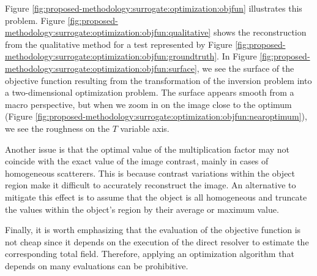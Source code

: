 			Figure \ref{fig:proposed-methodology:surrogate:optimization:objfun} illustrates this problem. Figure \ref{fig:proposed-methodology:surrogate:optimization:objfun:qualitative} shows the reconstruction from the qualitative method for a test represented by Figure \ref{fig:proposed-methodology:surrogate:optimization:objfun:groundtruth}. In Figure \ref{fig:proposed-methodology:surrogate:optimization:objfun:surface}, we see the surface of the objective function resulting from the transformation of the inversion problem into a two-dimensional optimization problem. The surface appears smooth from a macro perspective, but when we zoom in on the image close to the optimum (Figure \ref{fig:proposed-methodology:surrogate:optimization:objfun:nearoptimum}), we see the roughness on the $T$ variable axis.
			
			Another issue is that the optimal value of the multiplication factor may not coincide with the exact value of the image contrast, mainly in cases of homogeneous scatterers. This is because contrast variations within the object region make it difficult to accurately reconstruct the image. An alternative to mitigate this effect is to assume that the object is all homogeneous and truncate the values within the object's region by their average or maximum value.
			
			Finally, it is worth emphasizing that the evaluation of the objective function is not cheap since it depends on the execution of the direct resolver to estimate the corresponding total field. Therefore, applying an optimization algorithm that depends on many evaluations can be prohibitive.

